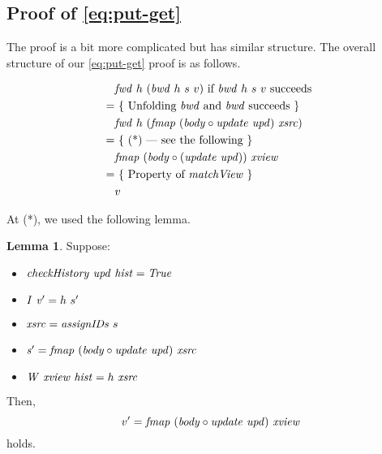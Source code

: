 \documentclass{article}
\theoremstyle{definition}
\newtheorem{lemma}{Lemma}
\begin{document}
\subsection{Proof of \ref{eq:put-get}}

The proof is a bit more complicated but has similar structure.
The overall structure of our \ref{eq:put-get} proof is as follows. 

\begin{align*}
  & \mathit{fwd}~h~(\mathit{bwd}~h~s~v) \mbox{ if $\mathit{bwd}~h~s~v$ succeeds } \\
= & ~\{ \mbox{ Unfolding $\mathit{bwd}$ and $\mathit{bwd}$ succeeds } \}\\
  & \mathit{fwd}~h~(\mathit{fmap}~(\mathit{body} \circ \mathit{update}~\mathit{upd})~\mathit{xsrc})\\
= & ~\{ \mbox{ (*) --- see the following } \}\\
  & \mathit{fmap}~(\mathit{body} \circ (\mathit{update}~\mathit{upd}))~\mathit{xview}\\
= & ~\{ \mbox{ Property of $\mathit{matchView}$ } \} \\
  & v 
\end{align*}

At (*), we used the following lemma.
\begin{lemma}
Suppose: 
\begin{itemize}
\item  $\mathit{checkHistory}~\mathit{upd}~\mathit{hist} = \mathit{True}$
\item $\mathit{I}~\mathit{v'} = h~s'$
\item  $\mathit{xsrc} = \mathit{assignIDs}~s$ 
\item  $\mathit{s'} = \mathit{fmap}~(\mathit{body} \circ \mathit{update}~\mathit{upd})~\mathit{xsrc}$ 
\item  $\mathit{W}~\mathit{xview}~\mathit{hist} = h~\mathit{xsrc}$ 
\end{itemize}
Then, 
\[
  v' = \mathit{fmap}~(\mathit{body} \circ \mathit{update}~\mathit{upd})~\mathit{xview}
\]
holds.
\end{lemma}
\end{document}
